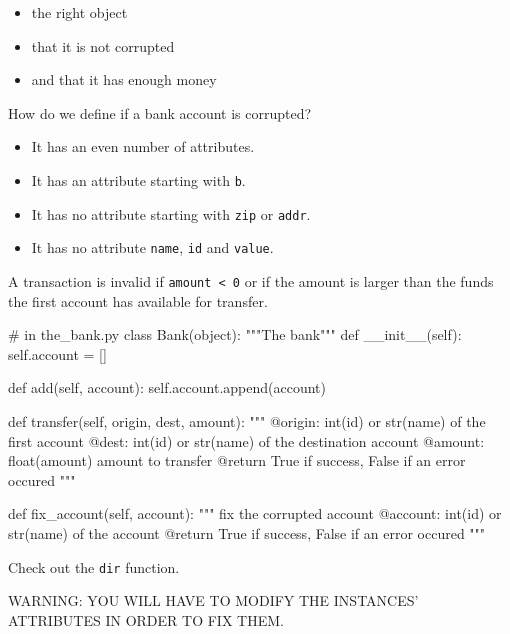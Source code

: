 \documentclass[]{article}
\newenvironment{Shaded}{\begin{snugshade}}{\end{snugshade}}
\newcommand{\BuiltInTok}[1]{\textcolor[rgb]{0.50,0.55,0.55}{#1}}
\newcommand{\CommentTok}[1]{\textcolor[rgb]{0.48,0.49,0.49}{#1}}
\newcommand{\FunctionTok}[1]{\textcolor[rgb]{0.56,0.27,0.68}{#1}}
\newcommand{\KeywordTok}[1]{\textcolor[rgb]{0.81,0.81,0.76}{#1}}
\newcommand{\NormalTok}[1]{\textcolor[rgb]{0.81,0.81,0.76}{#1}}
\newcommand{\OperatorTok}[1]{\textcolor[rgb]{0.81,0.81,0.76}{#1}}
\newcommand{\VariableTok}[1]{\textcolor[rgb]{0.15,0.68,0.68}{#1}}
\begin{document}
\begin{itemize}
\item
  the right object
\item
  that it is not corrupted
\item
  and that it has enough money
\end{itemize}

How do we define if a bank account is corrupted?

\begin{itemize}
\item
  It has an even number of attributes.
\item
  It has an attribute starting with \texttt{b}.
\item
  It has no attribute starting with \texttt{zip} or \texttt{addr}.
\item
  It has no attribute \texttt{name}, \texttt{id} and \texttt{value}.
\end{itemize}

A transaction is invalid if \texttt{amount\ \textless{}\ 0} or if the
amount is larger than the funds the first account has available for
transfer.

\begin{Shaded}
\begin{Highlighting}[]
\CommentTok{# in the_bank.py}
\KeywordTok{class}\NormalTok{ Bank(}\BuiltInTok{object}\NormalTok{):}
    \CommentTok{"""The bank"""}
    \KeywordTok{def} \FunctionTok{__init__}\NormalTok{(}\VariableTok{self}\NormalTok{):}
        \VariableTok{self}\NormalTok{.account }\OperatorTok{=}\NormalTok{ []}

    \KeywordTok{def}\NormalTok{ add(}\VariableTok{self}\NormalTok{, account):}
        \VariableTok{self}\NormalTok{.account.append(account)}

    \KeywordTok{def}\NormalTok{ transfer(}\VariableTok{self}\NormalTok{, origin, dest, amount):}
        \CommentTok{"""}
\CommentTok{            @origin:  int(id) or str(name) of the first account}
\CommentTok{            @dest:    int(id) or str(name) of the destination account}
\CommentTok{            @amount:  float(amount) amount to transfer}
\CommentTok{            @return         True if success, False if an error occured}
\CommentTok{        """}

    \KeywordTok{def}\NormalTok{ fix_account(}\VariableTok{self}\NormalTok{, account):}
        \CommentTok{"""}
\CommentTok{            fix the corrupted account}
\CommentTok{            @account: int(id) or str(name) of the account}
\CommentTok{            @return         True if success, False if an error occured}
\CommentTok{        """}
\end{Highlighting}
\end{Shaded}

Check out the \texttt{dir} function.

WARNING: YOU WILL HAVE TO MODIFY THE INSTANCES' ATTRIBUTES IN ORDER TO
FIX THEM.

\clearpage
\end{document}
